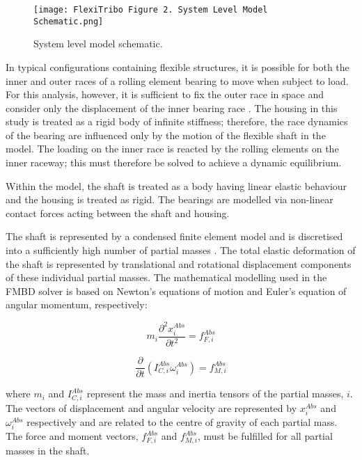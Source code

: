 \begin{figure}  
	\texttt{[image: FlexiTribo Figure 2. System Level Model Schematic.png]}
	\caption{System level model schematic.}
	\label{System level model schematic}
\end{figure} 

In typical configurations containing flexible structures, it is possible for both the inner and outer races of a rolling element bearing to move when subject to load. For this analysis, however, it is sufficient to fix the outer race in space and consider only the displacement of the inner bearing race \cite{DeMul1989_2}. The housing in this study is treated as a rigid body of infinite stiffness; therefore, the race dynamics of the bearing are influenced only by the motion of the flexible shaft in the model. The loading on the inner race is reacted by the rolling elements on the inner raceway; this must therefore be solved to achieve a dynamic equilibrium.

Within the model, the shaft is treated as a body having linear elastic behaviour and the housing is treated as rigid. The bearings are modelled via non-linear contact forces acting between the shaft and housing.

The shaft is represented by a condensed finite element model and is discretised into a sufficiently high number of partial masses \cite{Parikyan2001}. The total elastic deformation of the shaft is represented by translational and rotational displacement components of these individual partial masses. The mathematical modelling used in the FMBD solver is based on Newton’s equations of motion and Euler’s equation of angular momentum, respectively:

\begin{equation}\label{NewtonFMBD}
	m_i \frac{\partial^2 x_i^{A b s}}{\partial t^2}=f_{F, i}^{A b s}
\end{equation}

\begin{equation}\label{EulerFMBD}
	\frac{\partial}{\partial t}\left(I_{C, i}^{A b s} \omega_i^{A b s}\right)=f_{M, i}^{A b s}
\end{equation}

where $m_i$ and $I_{C, i}^{A b s}$ represent the mass and inertia tensors of the partial masses, $i$. The vectors of displacement and angular velocity are represented by $x_i^{A b s}$ and $\omega_i^{A b s}$ respectively and are related to the centre of gravity of each partial mass. The force and moment vectors, $f_{F, i}^{A b s}$ and $f_{M, i}^{A b s}$, must be fulfilled for all partial masses in the shaft.

